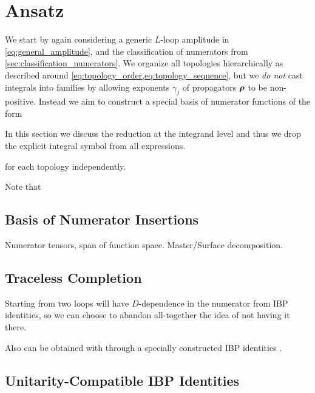 \section{Ansatz}
\label{sec:ansatz_integrand}

We start by again considering a generic $L$-loop amplitude in \cref{eq:general_amplitude},
and  the classification of numerators from \cref{sec:classification_numerators}.
We organize all topologies hierarchically as described around \cref{eq:topology_order,eq:topology_sequence},
but we \emph{do not} cast integrals into families by allowing exponents $\gamma_j$ of propagators $\vb*{\rho}$ to be non-positive.
Instead we aim to construct a special basis of numerator functions of the form 
  
In this section we discuss the reduction at the integrand level and thus we drop the explicit integral symbol from all expressions.


for each topology independently.

Note that 





\subsection{Basis of Numerator Insertions}
Numerator tensors, span of function space. Master/Surface decomposition.





\subsection{Traceless Completion}
\label{sec:traceless_completion}

Starting from two loops will have $D$-dependence in the numerator from IBP identities, so
we can choose to abandon all-together the idea of not having it there.

Also can be obtained with through a specially constructed IBP identities \cite{Ita:2015tya}.


\subsection{Unitarity-Compatible IBP Identities}

